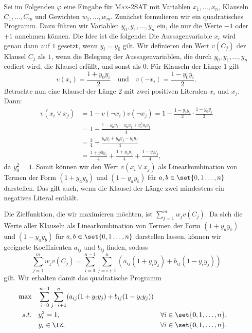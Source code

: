 \documentclass[language=ngerman,algolist]{TemplateLecture}
\begin{document}
Sei im Folgenden $\varphi$ eine Eingabe für \textsc{Max-2SAT} mit Variablen $x_1, \ldots, x_n$, Klauseln $C_1, \ldots, C_m$ und Gewichten $w_1, \ldots, w_m$. Zunächst formulieren wir ein quadratisches Programm. Dazu führen wir Variablen $y_0, y_1, \ldots, y_n$ ein, die nur die Werte $-1$ oder $+1$ annehmen können. Die Idee ist die folgende: Die Aussagenvariable $x_i$ wird genau dann auf $1$ gesetzt, wenn $y_i = y_0$ gilt. Wir definieren den Wert $v(C_j)$ der Klausel $C_j$ als $1$, wenn die Belegung der Aussagenvariablen, die durch $y_0, y_1, \ldots, y_n$ codiert wird, die Klausel erfüllt, und sonst als $0$. Für Klauseln der Länge $1$ gilt 
\begin{equation*}
    v(x_i) = \frac{1 + y_0 y_i}{2} \quad \text{und} \quad v(\neg x_i) = \frac{1 - y_0 y_i}{2}.
\end{equation*}
Betrachte nun eine Klausel der Länge $2$ mit zwei positiven Literalen $x_i$ und $x_j$. Dann:
\begin{equation*}
    \begin{split}
        v(x_i \vee x_j) &= 1 - v(\neg x_i)v(\neg x_j) = 1 - \frac{1 - y_0 y_i}{2} \cdot \frac{1 - y_0 y_j}{2} \\
        &= 1 - \frac{1 - y_0 y_i - y_0 y_j + y_0^2 y_i y_j}{4} \\
        &= \frac{3}{4} + \frac{y_0 y_i + y_0 y_j - y_i y_j}{4} \\
        &= \frac{1 + y0 y_i}{4} + \frac{1 + y_0 y_j}{4} + \frac{1 - y_i y_j}{4},
    \end{split}
\end{equation*}
da $y_0^2 = 1$. Somit können wir den Wert $v(x_i \vee x_j)$ als Linearkombination von Termen der Form $(1 + y_a y_b)$ und $(1 - y_a y_b)$ für $a, b \in \set{0,1\ldots,n}$ darstellen. Das gilt auch, wenn die Klausel der Länge zwei mindestens ein negatives Literal enthält.

Die Zielfunktion, die wir maximieren möchten, ist $\sum_{j = 1}^m w_j v(C_j)$. Da sich die Werte aller Klauseln als Linearkombination von Termen der Form $(1 + y_a y_b)$ und $(1 - y_a y_b)$ für $a, b \in \set{0,1\ldots,n}$ darstellen lassen, können wir geeignete Koeffizienten $a_{ij}$ und $b_{ij}$ finden, sodass 
\begin{equation*}
    \sum_{j = 1}^m w_j v(C_j) = \sum_{i = 0}^{n-1} \sum_{j = i + 1}^n (a_{ij} (1 + y_i y_j) + b_{ij} (1 - y_i y_j))
\end{equation*}
gilt. Wir erhalten damit das quadratische Programm 
\begin{align*}
    \max \quad & \sum_{i = 0}^{n-1} \sum_{j = i + 1}^n (a_{ij} (1 + y_i y_j) + b_{ij} (1 - y_i y_j)) \\
    s.t. \quad & y_i^2 = 1, && \forall i \in \set{0,1,\ldots,n}, \\
    & y_i \in \IZ, && \forall i \in \set{0,1,\ldots,n}.
\end{align*}
\end{document}
